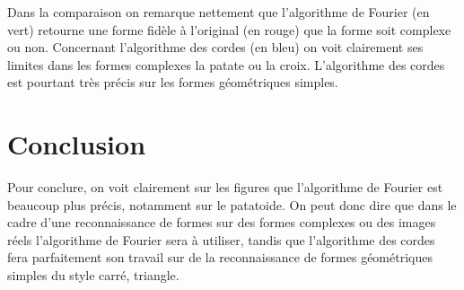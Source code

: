 \documentclass[a4paper,12pt]{report}
\begin{document}
Dans la comparaison on remarque nettement que l'algorithme de Fourier (en vert) retourne une forme fidèle à l'original (en rouge) que la forme soit complexe ou non. Concernant l'algorithme des cordes (en bleu) on voit clairement ses limites dans les formes complexes la patate ou la croix. L'algorithme des cordes est pourtant très précis sur les formes géométriques simples.


\section*{Conclusion}

Pour conclure, on voit clairement sur les figures que l'algorithme de Fourier est beaucoup plus précis, notamment sur le patatoide. On peut donc dire que dans le cadre d'une reconnaissance de formes sur des formes complexes ou des images réels l'algorithme de Fourier sera à utiliser, tandis que l'algorithme des cordes fera parfaitement son travail sur de la reconnaissance de formes géométriques simples du style carré, triangle.
\end{document}
